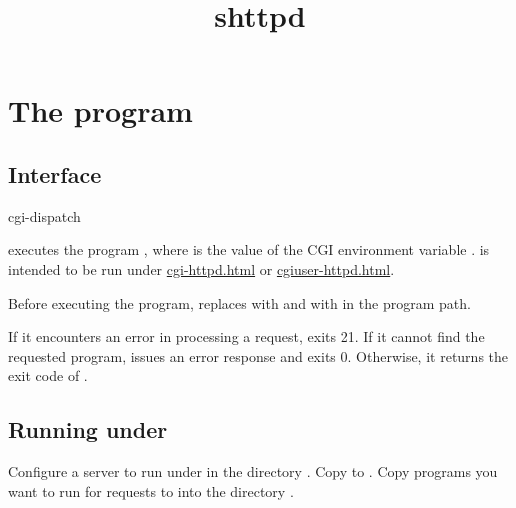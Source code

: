 \documentclass{book}
\title{shttpd}
\begin{document}
\section{The  program}

\subsection{Interface}
\begin{code}
  cgi-dispatch
\end{code}

 executes the program , where
 is the value of the CGI environment variable .
 is intended to be run under
\href{\cmd{cgi-httpd}}{cgi-httpd.html} or
\href{\cmd{cgiuser-httpd}}{cgiuser-httpd.html}.

Before executing the program,  replaces \cmd{//} with \cmd{/}
and  with \cmd{/:} in the program path.

If it encounters an error in processing a request,  exits 21.
If it cannot find the requested program,  issues an error
response and exits 0.  Otherwise, it returns the exit code of .

\subsection{Running under }
Configure a server to run  under  in the
directory .  Copy  to .  Copy programs
you want  to run for requests to  into the
directory .
\end{document}
